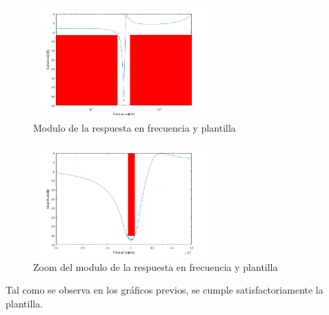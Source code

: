 \documentclass[../../tc_tp5_main.tex]{subfiles}
\begin{document}
\begin{figure}[H]	
	\centering
	\includegraphics[width=0.6\textwidth]{imagenes/magplant.png}
	\caption{Modulo de la respuesta en frecuencia y plantilla}
\end{figure}

\begin{figure}[H]	
	\centering
	\includegraphics[width=0.6\textwidth]{imagenes/Zmagplant.png}
	\caption{Zoom del modulo de la respuesta en frecuencia y plantilla}
\end{figure}

Tal como se observa en los gráficos previos, se cumple satisfactoriamente la plantilla.



\clearpage\newpage
\end{document}
